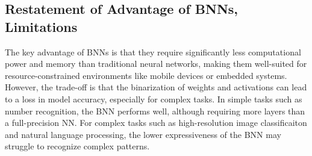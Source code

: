 \subsection{Restatement of Advantage of BNNs, Limitations}
The key advantage of BNNs is that they require significantly less computational power and memory than traditional neural networks, making them well-suited for resource-constrained environments like mobile devices or embedded systems. However, the trade-off is that the binarization of weights and activations can lead to a loss in model accuracy, especially for complex tasks. In simple tasks such as number recognition, the BNN performs well, although requiring more layers than a full-precision NN. For complex tasks such as high-resolution image classificaiton and natural language processing, the lower expressiveness of the BNN may struggle to recognize complex patterns.
\nocite{bnn1, vid1, vid2, vid3, vid4, vid5, vid6}

